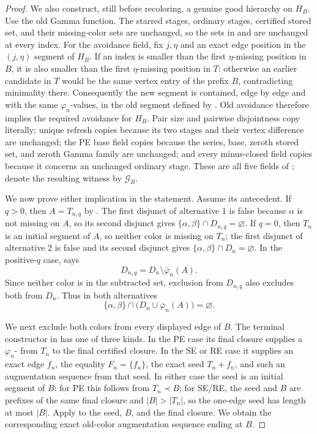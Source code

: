 \begin{proof}
We also construct, still before recoloring, a genuine good hierarchy on
$H_B$.  Use the old Gamma function.  The starred stages, ordinary stages,
certified stored set, and their missing-color sets are unchanged, so the
sets in  and
 are unchanged at every index.  For
the avoidance field, fix $j,\eta$ and an exact edge position in the
$(j,\eta)$ segment of $H_B$.  If an index is smaller than the first
$\eta$-missing position in $B$, it is also smaller than the first
$\eta$-missing position in $T$: otherwise an earlier candidate in $T$
would be the same vertex entry of the prefix $B$, contradicting
minimality there.  Consequently the new segment is contained, edge by
edge and with the same $\varphi_n$-values, in the old segment defined by
.  Old avoidance therefore implies the
required avoidance for $H_B$.  Pair size and pairwise disjointness copy
literally; unique refresh copies because its two stages and their vertex
difference are unchanged; the PE base field copies because the series,
base, zeroth stored set, and zeroth Gamma family are unchanged; and every
minus-closed field copies because it concerns an unchanged ordinary
stage.  These are all five fields of ; denote the
resulting witness by $\mathcal G_B$.

We now prove either implication in the statement.  Assume its antecedent.
If $q>0$, then $A=T_{n,q}$ by
.  The first disjunct of alternative 1 is
false because $\alpha$ is not missing on $A$, so its second disjunct gives
$\{\alpha,\beta\}\cap D_{n,q}=\varnothing$.  If $q=0$, then $T_n$ is an
initial segment of $A$, so neither color is missing on $T_n$; the first
disjunct of alternative 2 is false and its second disjunct gives
$\{\alpha,\beta\}\cap D_n=\varnothing$.  In the positive-$q$ case,
 says
\[
 D_{n,q}=D_n\setminus\overline\varphi_n(A).
\]
Since neither color is in the subtracted set, exclusion from $D_{n,q}$
also excludes both from $D_n$.  Thus in both alternatives
\[
 \{\alpha,\beta\}\cap
   \bigl(D_n\cup\overline\varphi_n(A)\bigr)=\varnothing.       \tag{4}
\]

We next exclude both colors from every displayed edge of $B$.  The
terminal constructor in  has one of three
kinds.  In the PE case its final closure supplies a
$\varphi_n$- from $T_n$ to the
final certified closure.  In the SE or RE case it supplies an exact edge
$f_n$, the equality $F_n=\{f_n\}$, the exact seed $T_n+f_n$, and such an
augmentation sequence from that seed.  In either case the seed is an
initial segment of $B$: for PE this follows from $T_n\prec B$; for SE/RE,
the seed and $B$ are prefixes of the same final closure and
$|B|>|T_n|$, so the one-edge seed has length at most $|B|$.  Apply
 to the seed, $B$, and the
final closure.  We obtain the corresponding exact old-color augmentation
sequence ending at $B$.                                             


\end{proof}
